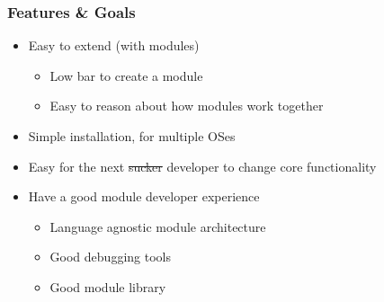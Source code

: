\begin{frame}
  \frametitle{Features \& Goals}
  \begin{itemize}
    \item Easy to extend (with modules)
      \pause
      \begin{itemize}
        \item Low bar to create a module
          \pause
        \item Easy to reason about how modules work together
      \end{itemize}
    \item Simple installation, for multiple OSes
      \pause
    \item Easy for the next \sout{sucker} developer to change core functionality
    \item Have a good module developer experience
      \begin{itemize}
          \pause
        \item Language agnostic module architecture
          \pause
        \item Good debugging tools
          \pause
        \item Good module library
      \end{itemize}
  \end{itemize}
\end{frame}
